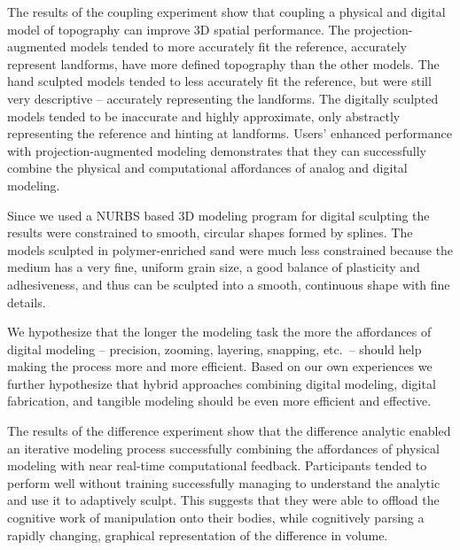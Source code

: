 \documentclass[prodmode,acmtochi]{acmsmall} %
\begin{document}
The results of the coupling experiment show that 
coupling a physical and digital model of topography 
can improve 3D spatial performance. 
%
The projection-augmented models tended
to more accurately fit the reference, 
accurately represent landforms, 
have more defined topography
than the other models. 
%
The hand sculpted models tended
to less accurately fit the reference, but
were still very descriptive 
-- accurately representing the landforms. 
%
The digitally sculpted models tended
to be inaccurate and highly approximate,
only abstractly representing the reference
and hinting at landforms. 
%
Users' enhanced performance with projection-augmented modeling 
demonstrates that they can successfully 
combine the physical and computational affordances 
of analog and digital modeling. 

Since we used a NURBS based 3D modeling program 
for digital sculpting
the results were constrained to smooth, circular shapes %
formed by splines.
%
%
The models sculpted in polymer-enriched sand 
were much less constrained 
because the medium has a very fine, uniform grain size,
a good balance of plasticity and adhesiveness,
and thus can be sculpted into a smooth, continuous shape
with fine details.

%
We hypothesize that the longer the modeling task
the more the affordances of digital modeling
-- precision, zooming, layering, snapping, etc.~--
should help
making the process more and more efficient. 
%
Based on our own experiences
we further hypothesize that 
hybrid approaches combining 
digital modeling, digital fabrication, and tangible modeling 
should be even more efficient and effective. 


The results of the difference experiment show that 
the difference analytic 
enabled an iterative modeling process
successfully combining the affordances of physical modeling
with near real-time computational feedback. 
%
Participants tended to perform well without training 
successfully managing to %
understand the analytic
and use it to adaptively sculpt.
%
This suggests that they were able to offload the cognitive work 
of manipulation onto their bodies, while cognitively 
parsing a rapidly changing, graphical representation of the difference in volume.
\end{document}
